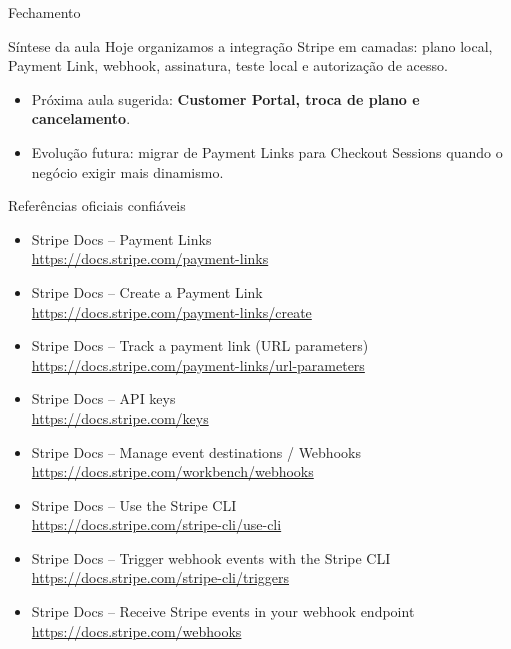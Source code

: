 \documentclass[aspectratio=169]{beamer}
\begin{document}
\begin{frame}{Fechamento}
\begin{block}{Síntese da aula}
Hoje organizamos a integração Stripe em camadas: plano local, Payment Link, webhook, assinatura, teste local e autorização de acesso.
\end{block}

\begin{itemize}
  \item Próxima aula sugerida: \textbf{Customer Portal, troca de plano e cancelamento}.
  \item Evolução futura: migrar de Payment Links para Checkout Sessions quando o negócio exigir mais dinamismo.
\end{itemize}
\end{frame}

\begin{frame}[allowframebreaks]{Referências oficiais confiáveis}
\footnotesize
\begin{itemize}
  \item Stripe Docs -- Payment Links\\
  \url{https://docs.stripe.com/payment-links}

  \item Stripe Docs -- Create a Payment Link\\
  \url{https://docs.stripe.com/payment-links/create}

  \item Stripe Docs -- Track a payment link (URL parameters)\\
  \url{https://docs.stripe.com/payment-links/url-parameters}

  \item Stripe Docs -- API keys\\
  \url{https://docs.stripe.com/keys}

  \item Stripe Docs -- Manage event destinations / Webhooks\\
  \url{https://docs.stripe.com/workbench/webhooks}

  \item Stripe Docs -- Use the Stripe CLI\\
  \url{https://docs.stripe.com/stripe-cli/use-cli}

  \item Stripe Docs -- Trigger webhook events with the Stripe CLI\\
  \url{https://docs.stripe.com/stripe-cli/triggers}

  \item Stripe Docs -- Receive Stripe events in your webhook endpoint\\
  \url{https://docs.stripe.com/webhooks}


\end{itemize}
\end{frame}
\end{document}
